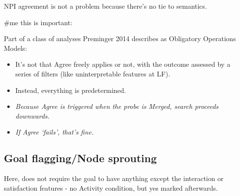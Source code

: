NPI agreement is not a problem because there's no tie to semantics.

\#me this is important:

Part of a class of analyses Preminger 2014 describes as Obligatory Operations Models:

\begin{itemize}
  \item It's not that Agree freely applies or not, with the outcome assessed by a series of filters (like uninterpretable features at LF).
  \item Instead, everything is predetermined.
  \item \textit{Because Agree is triggered when the probe is Merged, search proceeds downwards.}
  \item \textit{If Agree `fails', that's fine.}
\end{itemize}

\subsection*{Goal flagging/Node sprouting}

Here, does not require the goal to have anything except the interaction or satisfaction features - no Activity condition, but yes marked afterwards.
